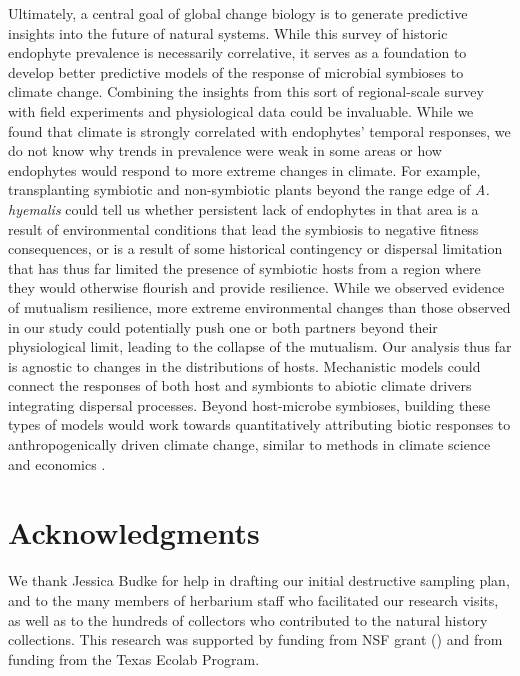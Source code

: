 \documentclass[11pt]{article}
\begin{document}
Ultimately, a central goal of global change biology is to generate predictive insights into the future of natural systems. 
While this survey of historic endophyte prevalence is necessarily correlative, it serves as a foundation to develop better predictive models of the response of microbial symbioses to climate change. 
Combining the insights from this sort of regional-scale survey with field experiments and physiological data could be invaluable. 
While we found that climate is strongly correlated with endophytes' temporal responses, we do not know why trends in prevalence were weak in some areas or how endophytes would respond to more extreme changes in climate.
For example, transplanting symbiotic and non-symbiotic plants beyond the range edge of \emph{A. hyemalis} could tell us whether persistent lack of endophytes in that area is a result of environmental conditions that lead the symbiosis to negative fitness consequences, or is a result of some historical contingency or dispersal limitation that has thus far limited the presence of symbiotic hosts from a region where they would otherwise flourish and provide resilience.
While we observed evidence of mutualism resilience, more extreme environmental changes than those observed in our study could potentially push one or both partners beyond their physiological limit, leading to the collapse of the mutualism. 
Our analysis thus far is agnostic to changes in the distributions of hosts. 
Mechanistic models could connect the responses of both host and symbionts to abiotic climate drivers integrating dispersal processes. 
Beyond host-microbe symbioses, building these types of models would work towards quantitatively attributing biotic responses to anthropogenically driven climate change, similar to methods in climate science and economics \citep{stott2010detection, carleton2016social}.



	
	\section*{Acknowledgments}
	We thank Jessica Budke for help in drafting our initial destructive sampling plan, and to the many members of herbarium staff who facilitated our research visits, as well as to the hundreds of collectors who contributed to the natural history collections. 
	This research was supported by funding from NSF grant () and from funding from the Texas Ecolab Program.
\end{document}
